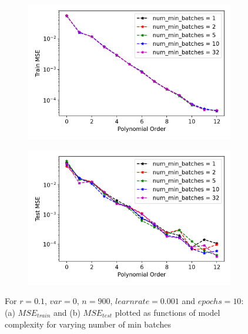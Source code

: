 \begin{figure}
\centering
\begin{subfigure}{.5\textwidth}
  \centering
  \includegraphics[width=.9\linewidth]{Images/olssgd4.png}
  \caption{}
  \label{fig:olssgd4}
\end{subfigure}%
\begin{subfigure}{.5\textwidth}
  \centering
  \includegraphics[width=.9\linewidth]{Images/olssgd3.png}
  \caption{}
  \label{fig:olssgd3}
\end{subfigure}
\caption{For $r=0.1$, $var=0$, $n=900$, $learn rate = 0.001$ and $epochs=10$: (a) $MSE_{train}$ and (b) $MSE_{test}$ plotted as functions of model complexity for varying number of min batches}
\label{fig:ols sgd num min batches}
\end{figure}

